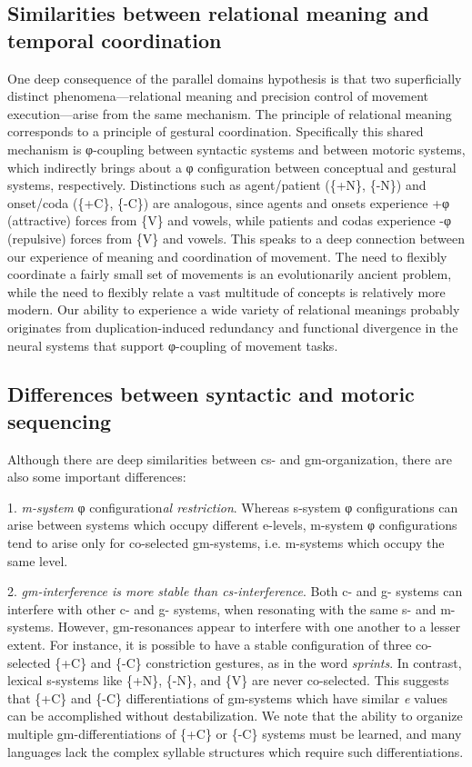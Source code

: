 \subsection{Similarities between relational meaning and temporal coordination}

One deep consequence of the parallel domains hypothesis is that two superficially distinct phenomena—relational meaning and precision control of movement execution—arise from the same mechanism. The principle of relational meaning corresponds to a principle of gestural coordination. Specifically this shared mechanism is φ-coupling between syntactic systems and between motoric systems, which indirectly brings about a φ configuration between conceptual and gestural systems, respectively. Distinctions such as agent/patient (\{+N\}, \{-N\}) and onset/coda (\{+C\}, \{-C\}) are analogous, since agents and onsets experience +φ (attractive) forces from \{V\} and vowels, while patients and codas experience -φ (repulsive) forces from \{V\} and vowels. This speaks to a deep connection between our experience of meaning and coordination of movement. The need to flexibly coordinate a fairly small set of movements is an evolutionarily ancient problem, while the need to flexibly relate a vast multitude of concepts is relatively more modern. Our ability to experience a wide variety of relational meanings probably originates from duplication-induced redundancy and functional divergence in the neural systems that support φ-coupling of movement tasks. 

\subsection{Differences between syntactic and motoric sequencing} 

Although there are deep similarities between cs- and gm-organization, there are also some important differences: 

1. \textit{m-system} φ configuration\textit{al restriction}. Whereas s-system φ configurations can arise between systems which occupy different e-levels, m-system φ configurations tend to arise only for co-selected gm-systems, i.e. m-systems which occupy the same level. 

2. \textit{gm-interference is more stable than cs-interference}. Both c- and g- systems can interfere with other c- and g- systems, when resonating with the same s- and m- systems. However, gm-resonances appear to interfere with one another to a lesser extent. For instance, it is possible to have a stable configuration of three co-selected \{+C\} and \{-C\} constriction gestures, as in the word \textit{sprints}. In contrast, lexical s-systems like \{+N\}, \{-N\}, and \{V\} are never co-selected. This suggests that \{+C\} and \{-C\} differentiations of gm-systems which have similar \textit{e} values can be accomplished without destabilization. We note that the ability to organize multiple gm-differentiations of \{+C\} or \{-C\} systems must be learned, and many languages lack the complex syllable structures which require such differentiations.

